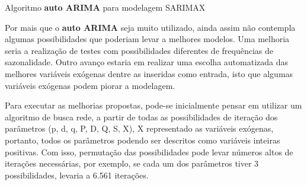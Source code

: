 \begin{algorithm}[!htbp]
    
\caption{Algoritmo \textbf{auto ARIMA} para modelagem SARIMAX \cite{hyndman2007automatic}}
\label{algo:auto_arima}
\end{algorithm}

Por mais que o \textbf{auto ARIMA} seja muito utilizado, ainda assim não contempla algumas possibilidades que poderiam levar a melhores modelos. Uma melhoria seria a realização de testes com possibilidades diferentes de frequências de sazonalidade. Outro avanço estaria em realizar uma escolha automatizada das melhores variáveis exógenas dentre as inseridas como entrada, isto que algumas variáveis exógenas podem piorar a modelagem.

Para executar as melhorias propostas, pode-se inicialmente pensar em utilizar um algoritmo de busca rede, a partir de todas as possibilidades de iteração dos parâmetros (p, d, q, P, D, Q, S, X), X representado as variáveis exógenas, portanto, todos os parâmetros podendo ser descritos como variáveis inteiras positivas. Com isso, permutação das possibilidades pode levar números altos de iterações necessárias, por exemplo, se cada um dos parâmetros tiver 3 possibilidades, levaria a 6.561 iterações.

